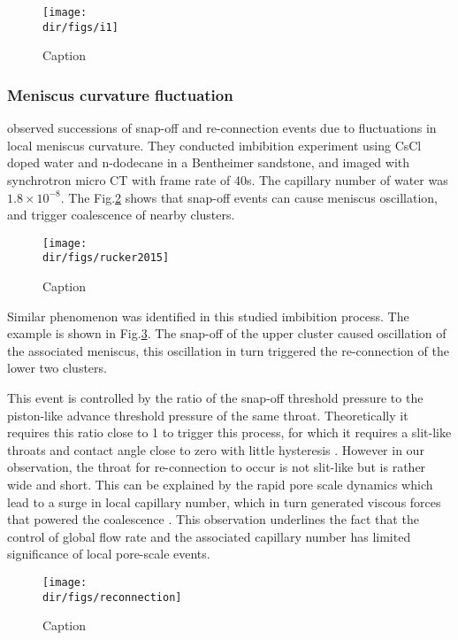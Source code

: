 \begin{figure}
    \centering
    \texttt{[image: \\dir/figs/i1]}
    \caption{Caption}
    \label{i1}
\end{figure}

\subsubsection{Meniscus curvature fluctuation}\label{meniscuscurvaturefluctuation}
\citep{rucker2015connected} observed successions of snap-off and re-connection events due to fluctuations in local meniscus curvature. They conducted imbibition experiment using CsCl doped water and n-dodecane in a Bentheimer sandstone, and imaged with synchrotron micro CT with frame rate of 40s. The capillary number of water was $1.8\times 10^{-8}$. The Fig.\ref{rucker2015} shows that snap-off events can cause meniscus oscillation, and trigger coalescence of nearby clusters. 

\begin{figure}
    \centering
    \texttt{[image: \\dir/figs/rucker2015]}
    \caption{Caption}
    \label{rucker2015}
\end{figure}

Similar phenomenon was identified in this studied imbibition process. The example is shown in Fig.\ref{reconnection}. The snap-off of the upper cluster caused oscillation of the associated meniscus, this oscillation in turn triggered the re-connection of the lower two clusters.

This event is controlled by the ratio of the snap-off threshold pressure to the piston-like advance threshold pressure of the same throat. Theoretically it requires this ratio close to 1 to trigger this process, for which it requires a slit-like throats and contact angle close to zero with little hysteresis \citep{blunt2017multiphase}. However in our observation, the throat for re-connection to occur is not slit-like but is rather wide and short. This can be explained by the rapid pore scale dynamics which lead to a surge in local capillary number\citep{armstrong2013interfacial}, which in turn generated viscous forces that powered the coalescence \citep{rucker2015connected}. This observation underlines the fact that the control of global flow rate and the associated capillary number has limited significance of local pore-scale events.

\begin{figure}
    \centering
    \texttt{[image: \\dir/figs/reconnection]}
    \caption{Caption}
    \label{reconnection}
\end{figure}

